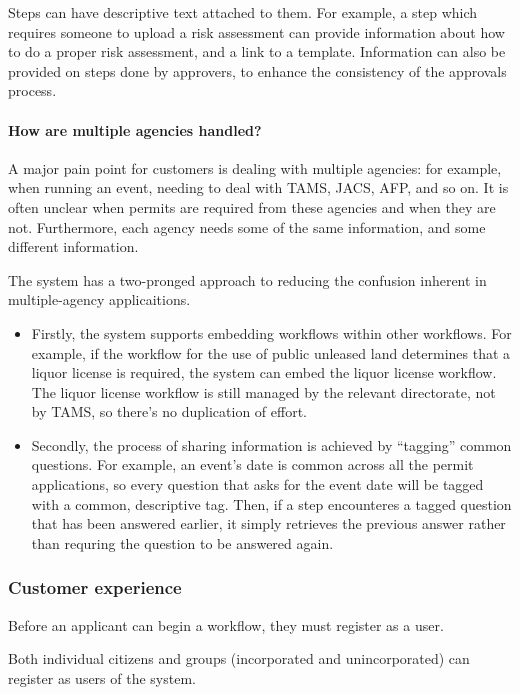 \documentclass[12pt,a4paper,twosided]{article}
\begin{document}
Steps can have descriptive text attached to them. For example, a step which requires someone to upload a risk assessment can provide information about how to do a proper risk assessment, and a link to a template. Information can also be provided on steps done by approvers, to enhance the consistency of the approvals process.

\paragraph{How are multiple agencies handled?}

A major pain point for customers is dealing with multiple agencies: for example, when running an event, needing to deal with TAMS, JACS, AFP, and so on. It is often unclear when permits are required from these agencies and when they are not. Furthermore, each agency needs some of the same information, and some different information. 

The system has a two-pronged approach to reducing the confusion inherent in multiple-agency applicaitions.
\begin{itemize}
\item Firstly, the system supports embedding workflows within other workflows. For example, if the workflow for the use of public unleased land determines that a liquor license is required, the system can embed the liquor license workflow. The liquor license workflow is still managed by the relevant directorate, not by TAMS, so there's no duplication of effort.

\item Secondly, the process of sharing information is achieved by ``tagging'' common questions. For example, an event's date is common across all the permit applications, so every question that asks for the event date will be tagged with a common, descriptive tag. Then, if a step encounteres a tagged question that has been answered earlier, it simply retrieves the previous answer rather than requring the question to be answered again.
\end{itemize}

\subsubsection{Customer experience}

Before an applicant can begin a workflow, they must register as a user.

Both individual citizens and groups (incorporated and unincorporated)
can register as users of the system.
\end{document}
